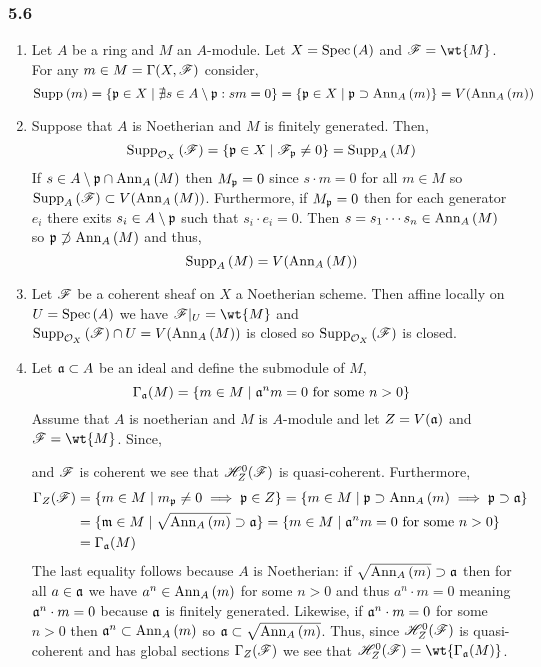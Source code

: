 \documentclass[12pt]{article}
\begin{document}
\subsubsection{5.6}

\begin{enumerate}
\item Let $A$ be a ring and $M$ an $A$-module. Let $X = \mathrm{Spec}\left( A \right)$ and $\F = \wt{M}$. For any $m \in M = \Gamma(X, \mathscr{F})$ consider,
\[ \mathrm{Supp}_{}\left(m \right) = \{ \mathfrak{p} \in X \mid \nexists s \in A \setminus \mathfrak{p} : s m = 0 \} = \{ \mathfrak{p} \in X \mid \mathfrak{p} \supset \mathrm{Ann}_{A}\left(m\right) \} = V(\mathrm{Ann}_{A}\left(m\right)) \]
\item Suppose that $A$ is Noetherian and $M$ is finitely generated. Then,
\[ \mathrm{Supp}_{\mathcal{O}_{X}}\left(\mathscr{F} \right) = \{ \mathfrak{p} \in X \mid \mathscr{F}_{\mathfrak{p}} \neq 0 \} = \mathrm{Supp}_{A}\left(M \right) \]
If $s \in A \setminus \mathfrak{p} \cap \mathrm{Ann}_{A}\left(M\right)$ then $M_{\mathfrak{p}} = 0$ since $s \cdot m = 0$ for all $m \in M$ so $\mathrm{Supp}_{A}\left(\mathscr{F} \right) \subset V(\mathrm{Ann}_{A}\left(M\right))$. Furthermore, if $M_{\mathfrak{p}} = 0$ then for each generator $e_i$ there exits $s_i \in A \setminus \mathfrak{p}$ such that $s_i \cdot e_i = 0$. Then $s = s_1 \cdots s_n \in \mathrm{Ann}_{A}\left(M\right)$ so $\mathfrak{p} \not\supset \mathrm{Ann}_{A}\left(M\right)$ and thus,
\[ \mathrm{Supp}_{A}\left(M \right) = V(\mathrm{Ann}_{A}\left(M\right)) \]
\item Let $\mathscr{F}$ be a coherent sheaf on $X$ a Noetherian scheme. Then affine locally on $U = \mathrm{Spec}\left( A \right)$ we have $\F|_U = \wt{M}$ and $\mathrm{Supp}_{\mathcal{O}_{X}}\left(\mathscr{F} \right) \cap U = V(\mathrm{Ann}_{A}\left(M\right))$ is closed so $\mathrm{Supp}_{\mathcal{O}_{X}}\left(\mathscr{F} \right)$ is closed.
\item Let $\mathfrak{a} \subset A$ be an ideal and define the submodule of $M$,
\[ \Gamma_{\mathfrak{a}}(M) = \{ m \in M \mid \mathfrak{a}^n m = 0 \text{ for some } n > 0 \} \]
Assume that $A$ is noetherian and $M$ is $A$-module and let $Z = V(\mathfrak{a})$ and $\F = \wt{M}$. Since,
\begin{center}
\end{center}
and $\mathscr{F}$ is coherent we see that $\mathscr{H}^0_Z(\mathscr{F})$ is quasi-coherent. Furthermore, 
\begin{align*}
\Gamma_Z(\mathscr{F}) & = \{ m \in M \mid m_{\mathfrak{p}} \neq 0 \implies \mathfrak{p} \in Z \} = \{ m \in M \mid \mathfrak{p} \supset \mathrm{Ann}_{A}\left(m\right) \implies \mathfrak{p} \supset \mathfrak{a} \} 
\\
& = \{ \mathfrak{m} \in M \mid \sqrt{\mathrm{Ann}_{A}\left(m\right)} \supset \mathfrak{a} \} = \{ m \in M \mid \mathfrak{a}^n m = 0 \text{ for some } n > 0 \} 
\\
& = \Gamma_{\mathfrak{a}}(M)
\end{align*}
The last equality follows because $A$ is Noetherian: if $\sqrt{\mathrm{Ann}_{A}\left(m\right)} \supset \mathfrak{a}$ then for all $a \in \mathfrak{a}$ we have $a^n \in \mathrm{Ann}_{A}\left(m\right)$ for some $n > 0$ and thus $a^n \cdot m = 0$ meaning $\mathfrak{a}^n \cdot m = 0$ because $\mathfrak{a}$ is finitely generated. Likewise, if $\mathfrak{a}^n \cdot m = 0$ for some $n > 0$ then $\mathfrak{a}^n \subset \mathrm{Ann}_{A}\left(m\right)$ so $\mathfrak{a} \subset \sqrt{\mathrm{Ann}_{A}\left(m\right)}$. Thus, since $\mathscr{H}^0_Z(\mathscr{F})$ is quasi-coherent and has global sections $\Gamma_Z(\mathscr{F})$ we see that $\H^0_Z(\F) = \wt{\Gamma_{\a}(M)}$.


\end{enumerate}
\end{document}

